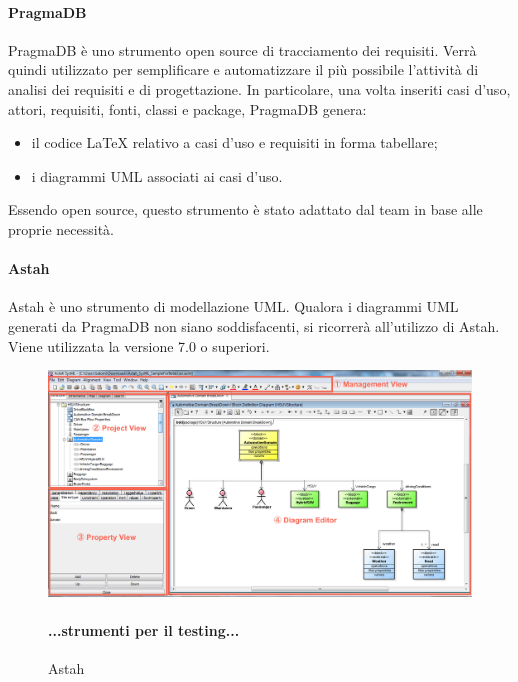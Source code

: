  \paragraph{PragmaDB} 
  PragmaDB è uno strumento open source di tracciamento dei requisiti. Verrà quindi utilizzato per semplificare e automatizzare il più possibile l'attività di analisi dei requisiti e di progettazione. In particolare, una volta inseriti casi d'uso, attori, requisiti, fonti, classi e package, PragmaDB genera: 
  \begin{itemize}
  \item il codice \LaTeX{} relativo a casi d'uso e requisiti in forma tabellare;
  \item i diagrammi UML associati ai casi d'uso.
  
  \end{itemize}
  Essendo open source, questo strumento è stato adattato dal team \GRUPPO{} in base alle proprie necessità.
  \paragraph{Astah}
  Astah è uno strumento di modellazione UML. Qualora i diagrammi UML generati da PragmaDB non siano soddisfacenti, si ricorrerà all'utilizzo di Astah. Viene utilizzata la versione 7.0 o superiori.
\begin{figure}[h]
\centering
\includegraphics[scale=0.3]{img/astah.png}
\caption{Astah}\label{sec:Figura1}
\paragraph{...strumenti per il testing...}
\end{figure}

\newpage


  

